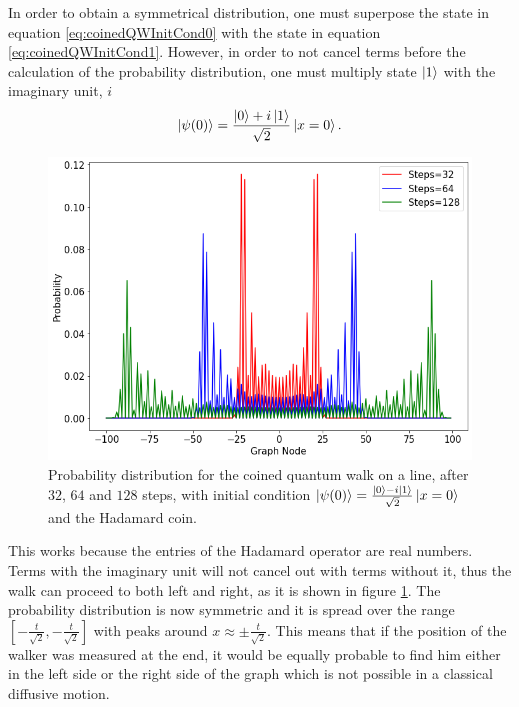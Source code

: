 \documentclass[../../dissertation.tex]{subfiles}
\begin{document}
In order to obtain a symmetrical distribution, one must superpose the state in
equation \eqref{eq:coinedQWInitCond0} with the state in equation
\ref{eq:coinedQWInitCond1}. However, in order to not cancel terms before the
calculation of the probability distribution, one must multiply state $\ket{1}$
with the imaginary unit, $i$ 
\begin{equation}
	\ket{\psi(0)} = \frac{\ket{0}+i\ket{1}}{\sqrt{2}}\ket{x=0}.
	\label{eq:12}
\end{equation}
\begin{figure}[!ht]
	\centering
	\includegraphics[scale=0.40]{img/CoinedQuantumWalk/CoinedMultiple_psi01_3264128}
	\caption{Probability distribution for the coined quantum walk on a line, after $32$, $64$ and $128$ steps, with initial condition $\ket{\psi(0)}=\frac{\ket{0}-i\ket{1}}{\sqrt{2}}\ket{x=0}$ and the Hadamard coin.} 
	\label{fig:coinedQWDist01}
\end{figure}
This works because the entries of the Hadamard operator are real numbers. Terms
with the imaginary unit will not cancel out with terms without it, thus the
walk can proceed to both left and right, as it is shown in figure
\ref{fig:coinedQWDist01}.  The probability distribution is now symmetric and it
is spread over the range $[-\frac{t}{\sqrt{2}},-\frac{t}{\sqrt{2}}]$ with peaks
around $x \approx \pm \frac{t}{\sqrt{2}}$. This means that if the position of
the walker was measured at the end, it would be equally probable to find him
either in the left side or the right side of the graph which is not possible
in a classical diffusive motion.\par 
\end{document}
